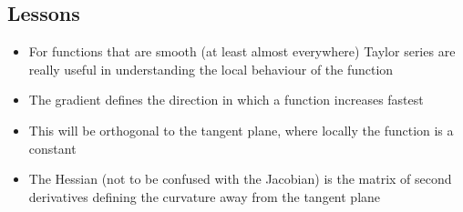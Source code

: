 
\begin{slide}
\section{Lessons}

\begin{PauseHighLight}
  \begin{itemize}
  \item For functions that are smooth (at least almost everywhere)
    Taylor series are really useful in understanding the local
    behaviour of the function\pause
  \item The gradient defines the direction in which a function
    increases fastest\pause
  \item This will be orthogonal to the tangent plane, where locally
    the function is a constant\pause
  \item The Hessian (not to be confused with the Jacobian) is the
    matrix of second derivatives defining the curvature away from the
    tangent plane\pause
  \end{itemize}
\end{PauseHighLight}


\end{slide}




